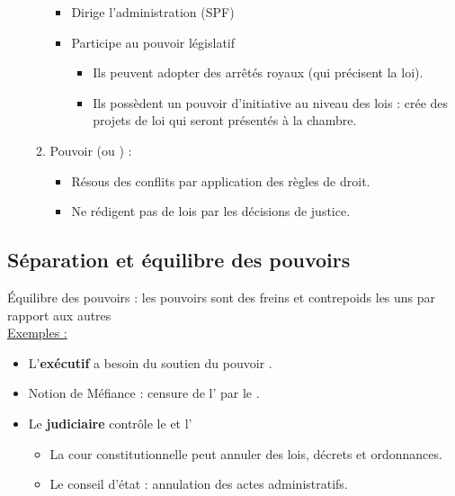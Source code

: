 \begin{itemize}
\begin{enumerate}
\begin{itemize}
            \item Dirige l'administration (SPF)
            \item Participe au pouvoir législatif
            \begin{itemize}
                \item Ils peuvent adopter des arrêtés royaux (qui précisent la loi).
                \item Ils possèdent un pouvoir d'initiative au niveau des lois : crée des projets de loi qui seront présentés à la chambre.
            \end{itemize}
        \end{itemize}
        \item Pouvoir  (ou ) :
        \begin{itemize}
            \item Résous des conflits par application des règles de droit.
            \item Ne rédigent pas de lois par les décisions de justice.
        \end{itemize}
    \end{enumerate}
\end{itemize}

\subsection{Séparation et équilibre des pouvoirs}

Équilibre des pouvoirs : les pouvoirs sont des freins et contrepoids les uns par rapport aux autres\\

\underline{Exemples :}
\begin{itemize}
    \item L'\textbf{exécutif} a besoin du soutien du pouvoir .
    \item Notion de Méfiance : censure de l' par le .
    \item Le \textbf{judiciaire} contrôle le  et l'
    \begin{itemize}
        \item La cour constitutionnelle peut annuler des lois, décrets et ordonnances.
        \item Le conseil d'état : annulation des actes administratifs.
    \end{itemize}
\end{itemize}

